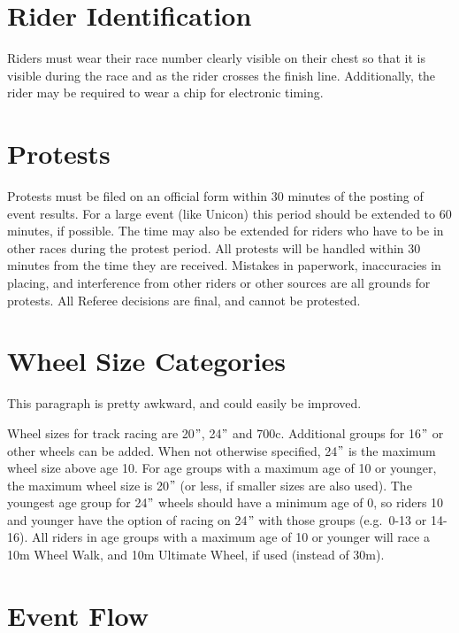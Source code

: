 \section{Rider Identification}

Riders must wear their race number clearly visible on their chest so that it is visible during the race and as the rider crosses the finish line.
Additionally, the rider may be required to wear a chip for electronic timing.

\section{Protests}

Protests must be filed on an official form within 30 minutes of the posting of event results.
For a large event (like Unicon) this period should be extended to 60 minutes, if possible.
The time may also be extended for riders who have to be in other races during the protest period.
All protests will be handled within 30 minutes from the time they are received.
Mistakes in paperwork, inaccuracies in placing, and interference from other riders or other sources are all grounds for protests.
All Referee decisions are final, and cannot be protested.

\section{Wheel Size Categories}

\begin{comment2016}
This paragraph is pretty awkward, and could easily be improved.
\end{comment2016}

Wheel sizes for track racing are 20$"$, 24$"$ and 700c.
Additional groups for 16$"$ or other wheels can be added.
When not otherwise specified, 24$"$ is the maximum wheel size above age 10.
For age groups with a maximum age of 10 or younger, the maximum wheel size is 20$"$ (or less, if smaller sizes are also used).
The youngest age group for 24$"$ wheels should have a minimum age of 0, so riders 10 and younger have the option of racing on 24$"$ with those groups (e.g.\ 0-13 or 14-16).
All riders in age groups with a maximum age of 10 or younger will race a 10m Wheel Walk, and 10m Ultimate Wheel, if used (instead of 30m).

\section{Event Flow}

